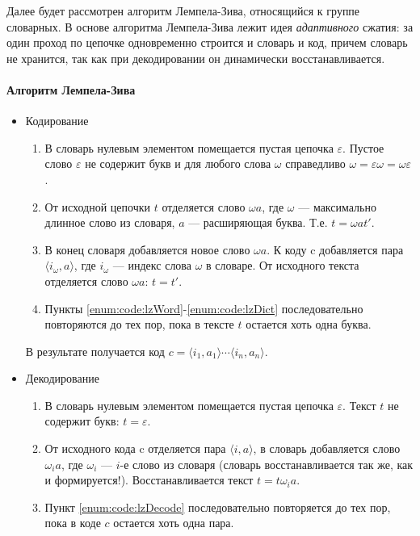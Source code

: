 Далее будет рассмотрен алгоритм Лемпела-Зива, относящийся к группе словарных. В основе алгоритма Лемпела-Зива лежит идея \emph{адаптивного} сжатия: за один проход по цепочке одновременно строится и словарь и код, причем словарь не хранится, так как при декодировании он динамически восстанавливается.

\paragraph{Алгоритм Лемпела-Зива}
\begin{itemize}
	\item Кодирование
	\begin{enumerate}
		\item В словарь нулевым элементом помещается пустая цепочка $\varepsilon$. Пустое слово $\varepsilon$ не содержит букв и для любого слова $\omega$ справедливо $\omega=\varepsilon\omega=\omega\varepsilon$.
        
        \item\label{enum:code:lzWord} От исходной цепочки $t$ отделяется слово $\omega a$, где $\omega$ --- максимально длинное слово из словаря, $a$ --- расширяющая буква. Т.е. $t=\omega at'$.
        
        \item\label{enum:code:lzDict} В конец словаря добавляется новое слово $\omega a$. К коду c добавляется пара $\langle i_{\omega},a\rangle$, где $i_{\omega}$ --- индекс слова $\omega$ в словаре. От исходного текста отделяется слово $\omega a$: $t=t'$.
        
        \item Пункты \ref{enum:code:lzWord}-\ref{enum:code:lzDict} последовательно повторяются до тех пор, пока в тексте $t$ остается хоть одна буква.
	\end{enumerate}
    В результате получается код $c=\langle i_1,a_1\rangle\cdots\langle i_n,a_n\rangle$.
    
	\item Декодирование
    \begin{enumerate}
        \item В словарь нулевым элементом помещается пустая цепочка $\varepsilon$. Текст $t$ не содержит букв: $t=\varepsilon$.
        
        \item\label{enum:code:lzDecode} От исходного кода c отделяется пара $\langle i,a\rangle$, в словарь добавляется слово $\omega_i a$, где $\omega_i$ --- $i$-е слово из словаря (словарь восстанавливается так же, как и формируется!). Восстанавливается текст $t=t\omega_i a$.
        
        \item Пункт \ref{enum:code:lzDecode} последовательно повторяется до тех пор, пока в коде $c$ остается хоть одна пара.
    \end{enumerate}
\end{itemize}

